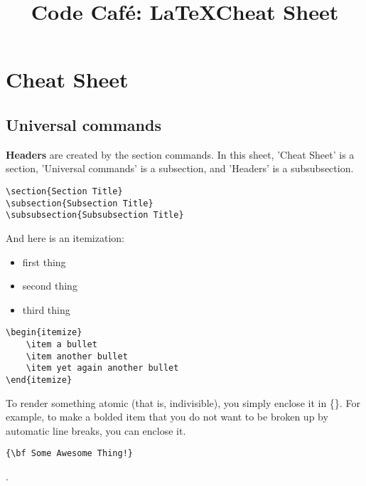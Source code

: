 \documentclass[12pt]{amsart}
\title{Code Caf\'e: \LaTeX Cheat Sheet}
\begin{document}
\maketitle
\tableofcontents

\section{Cheat Sheet}
\subsection{Universal commands}
{\bf Headers} are created by the section commands. In this sheet, 'Cheat Sheet' is a section, 'Universal commands' is a subsection, and 'Headers' is a subsubsection.\\
\begin{verbatim}
\section{Section Title}
\subsection{Subsection Title}
\subsubsection{Subsubsection Title}
\end{verbatim}
And here is an itemization:
\begin{itemize}
	\item first thing
	\item second thing
	\item third thing
\end{itemize}
	
\begin{verbatim}
\begin{itemize}
	\item a bullet
	\item another bullet
	\item yet again another bullet
\end{itemize}
\end{verbatim}

To render something atomic (that is, indivisible), you simply enclose it in \{\}.  For example, to make a bolded item that you do not want to be broken up by automatic line breaks, you can enclose it.
\begin{verbatim}{\bf Some Awesome Thing!}\end{verbatim}.
\end{document}
